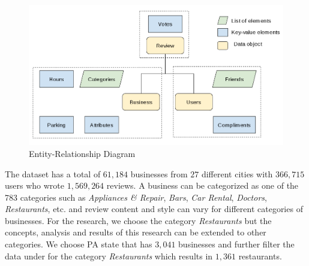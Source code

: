 \documentclass[12pt]{article}
\begin{document}
\begin{figure}[h]
\centering
\includegraphics[width=0.7\linewidth]{figure_er_diagram}
\caption{Entity-Relationship Diagram}
\label{fig:figure_er_diagram}
\end{figure}

The dataset has a total of $61,184$ businesses from $27$ different cities with $366,715$ users who wrote $1,569,264$ reviews. A business can be categorized as one of the 783 categories such as \textit{Appliances \& Repair}, \textit{Bars}, \textit{Car Rental}, \textit{Doctors}, \textit{Restaurants}, etc. and review content and style can vary for different categories of businesses. For the research, we choose the category \textit{Restaurants} but the concepts, analysis and results of this research can be extended to other categories. We choose PA state that has $3,041$ businesses and further filter the data under for the category \textit{Restaurants} which results in $1,361$ restaurants.
\end{document}
